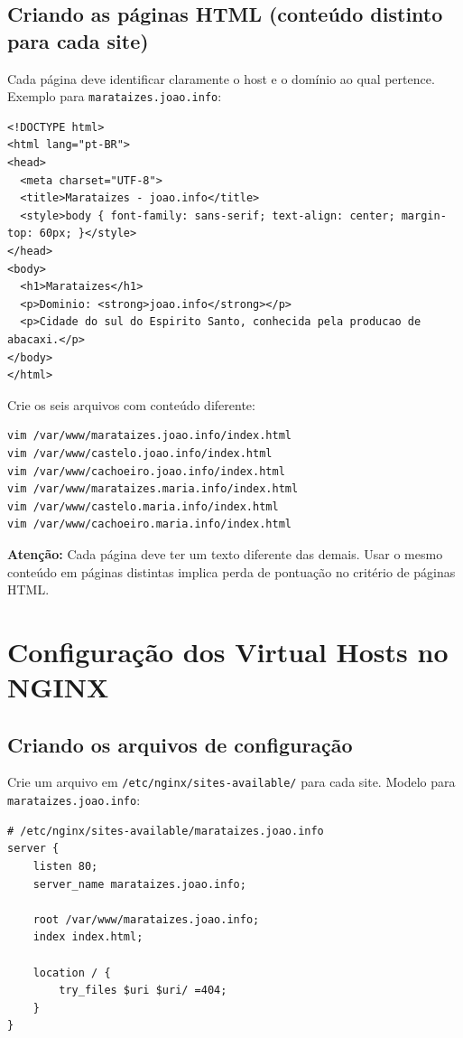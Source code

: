 \documentclass[11pt,a4paper]{article}
\begin{document}
\subsection{Criando as páginas HTML (conteúdo distinto para cada site)}

Cada página deve identificar claramente o host e o domínio ao qual pertence.
Exemplo para \texttt{marataizes.joao.info}:

\begin{lstlisting}[style=html]
<!DOCTYPE html>
<html lang="pt-BR">
<head>
  <meta charset="UTF-8">
  <title>Marataizes - joao.info</title>
  <style>body { font-family: sans-serif; text-align: center; margin-top: 60px; }</style>
</head>
<body>
  <h1>Marataizes</h1>
  <p>Dominio: <strong>joao.info</strong></p>
  <p>Cidade do sul do Espirito Santo, conhecida pela producao de abacaxi.</p>
</body>
</html>
\end{lstlisting}

Crie os seis arquivos com conteúdo diferente:

\begin{lstlisting}[style=bash]
vim /var/www/marataizes.joao.info/index.html
vim /var/www/castelo.joao.info/index.html
vim /var/www/cachoeiro.joao.info/index.html
vim /var/www/marataizes.maria.info/index.html
vim /var/www/castelo.maria.info/index.html
vim /var/www/cachoeiro.maria.info/index.html
\end{lstlisting}

\begin{alertbox}
  \textbf{Atenção:} Cada página deve ter um texto diferente das demais. Usar o mesmo conteúdo em páginas distintas implica perda de pontuação no critério de páginas HTML.
\end{alertbox}

\section{Configuração dos Virtual Hosts no NGINX}

\subsection{Criando os arquivos de configuração}

Crie um arquivo em \texttt{/etc/nginx/sites-available/} para cada site.
Modelo para \texttt{marataizes.joao.info}:

\begin{lstlisting}[style=conf]
# /etc/nginx/sites-available/marataizes.joao.info
server {
    listen 80;
    server_name marataizes.joao.info;

    root /var/www/marataizes.joao.info;
    index index.html;

    location / {
        try_files $uri $uri/ =404;
    }
}
\end{lstlisting}
\end{document}
